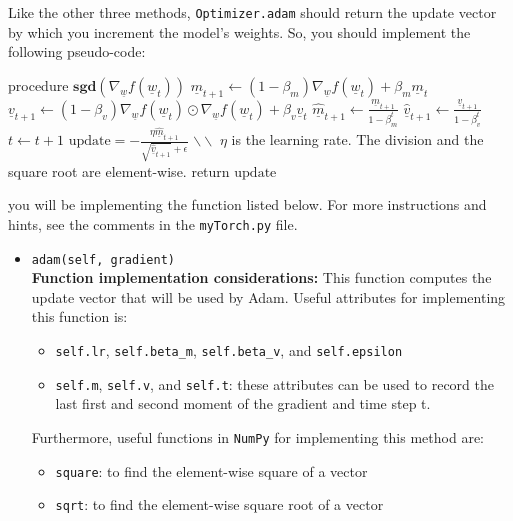 \documentclass{article}
\theoremstyle{definition}
\begin{document}
Like the other three methods, \verb|Optimizer.adam| should return the update vector by which you increment the model's weights. So, you should implement the following pseudo-code:
\begin{algorithm}[caption={\UseVerb{adam} method. $\underline{a} \odot \underline{a}$ indicates the elementwise	square of the vector $\underline{a}$. With $\beta_v^t$ and $\beta_m^t$ we denote $\beta_v$ and $\beta_m$ to the power $t$.}]
	procedure $\textbf{sgd}(\nabla_{\!\underline{w}}f(\underline{w}_t))$
	$\underline{m}_{t+1} \leftarrow (1 - \beta_m) \nabla_{\!\underline{w}}f(\underline{w}_t) + \beta_m \underline{m}_t$
	$\underline{v}_{t+1} \leftarrow (1 - \beta_v)  \nabla_{\!\underline{w}}f(\underline{w}_t) \odot \nabla_{\!\underline{w}}f(\underline{w}_t)  + \beta_v \underline{v}_t$
	$\hat{\underline{m}}_{t+1} \leftarrow \frac{\underline{m}_{t+1}}{1-\beta_m^t}$
	$\hat{\underline{v}}_{t+1} \leftarrow \frac{\underline{v}_{t+1}}{1-\beta_v^t}$
	$t \leftarrow t+1$
	$\text{update} = -\frac{\eta \hat{\underline{m}}_{t+1}} {\sqrt{\hat{\underline{v}}_{t+1}} + \epsilon}$ $\backslash \backslash$ $\eta$ is the learning rate. The division and the square root are element-wise.
	return $\text{update}$
\end{algorithm}
you will be implementing the function listed below. For more instructions and hints, see the comments in the \verb|myTorch.py| file.
	\begin{itemize}
	\item{\verb|adam(self, gradient)|\\\textbf{Function implementation considerations:}
		This function computes the update vector that will be used by Adam.	Useful attributes for implementing this function is: 
		\begin{itemize}
			\item  \verb|self.lr|, \verb|self.beta_m|, \verb|self.beta_v|, and \verb|self.epsilon|
			\item \verb|self.m|, \verb|self.v|, and \verb|self.t|: these attributes can be used to record the last first and second moment of the gradient and time step t.
		\end{itemize}}
		Furthermore, useful functions in \verb|NumPy| for implementing this method are:
		\begin{itemize}
			\item \verb|square|: to find the element-wise square of a vector
			\item \verb|sqrt|: to find the element-wise square root of a vector
		\end{itemize}
	\end{itemize}
\end{document}

